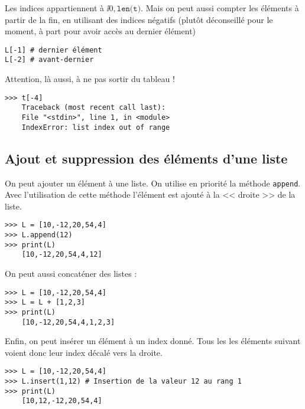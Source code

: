 %
%
%
%
%



Les indices appartiennent à $\ii{0,\texttt{len(t)}}$.
Mais on peut aussi compter les éléments à partir de la fin, en utilisant des indices négatifs (plutôt déconseillé pour le moment, à part pour avoir accès au dernier élément)
\begin{lstlisting}
L[-1] # dernier élément
L[-2] # avant-dernier
\end{lstlisting}

Attention, là aussi, à ne pas sortir du tableau !

\begin{lstlisting}
>>> t[-4]
    Traceback (most recent call last):
    File "<stdin>", line 1, in <module>
    IndexError: list index out of range
\end{lstlisting}


\subsection{Ajout et suppression des éléments d'une liste}
On peut ajouter un élément à une liste. On utilise en priorité la méthode \lstinline{append}. Avec l'utilisation de cette méthode l'élément est ajouté à la << droite >> de la liste. 

\begin{lstlisting}
>>> L = [10,-12,20,54,4]
>>> L.append(12)
>>> print(L)
    [10,-12,20,54,4,12]
\end{lstlisting}

On peut aussi concaténer des listes :
\begin{lstlisting}
>>> L = [10,-12,20,54,4]
>>> L = L + [1,2,3]
>>> print(L)
    [10,-12,20,54,4,1,2,3]
\end{lstlisting}


Enfin, on peut insérer un élément à un index donné. Tous les les éléments suivant voient donc leur index décalé vers la droite.  
\begin{lstlisting}
>>> L = [10,-12,20,54,4]
>>> L.insert(1,12) # Insertion de la valeur 12 au rang 1
>>> print(L)
    [10,12,-12,20,54,4]
\end{lstlisting}


